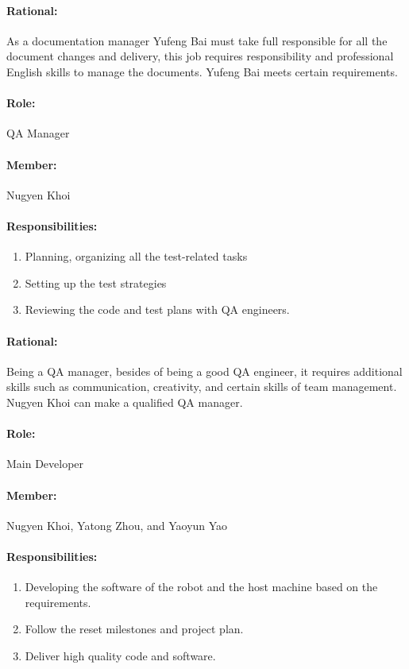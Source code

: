 \documentclass[11pt, a4paper]{report}
\begin{document}
\paragraph{Rational: \\}
As a documentation manager Yufeng Bai must take full responsible for all the document changes and delivery, this job requires responsibility and professional English skills to manage the documents. Yufeng Bai meets certain requirements.

\paragraph{Role: } QA Manager
\paragraph{Member: } Nugyen Khoi
\paragraph{Responsibilities: }
\begin{enumerate}
	\item  Planning, organizing all the test-related tasks
	\item  Setting up the test strategies
	\item  Reviewing the code and test plans with QA engineers.
\end{enumerate}
\paragraph{Rational: \\}
Being a QA manager, besides of being a good QA engineer, it requires additional skills such as communication, creativity, and certain skills of team management. Nugyen Khoi can make a qualified QA manager.

\paragraph{Role: } Main Developer
\paragraph{Member: } Nugyen Khoi, Yatong Zhou, and Yaoyun Yao
\paragraph{Responsibilities: }
\begin{enumerate}
	\item  Developing the software of the robot and the host machine based on the requirements.
	\item  Follow the reset milestones and project plan. 
	\item  Deliver high quality code and software.
\end{enumerate}
\end{document}

